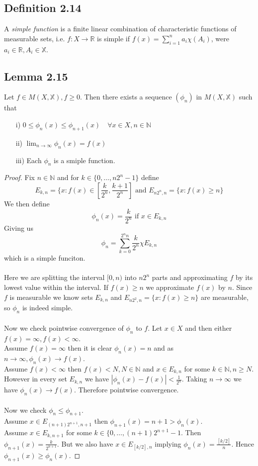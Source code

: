 \documentclass[a4paper, 12pt, twoside]{article}
\begin{document}
\subsection*{Definition 2.14}
A \emph{simple function} is a finite linear combination of characteristic functions of measurable sets, i.e. $f:X\to \mathbb{R}$ is simple if $f(x)=\sum_{i=1}^{n}a_{i} \chi(A_{i})$, were $a_{i}\in \mathbb{R}, A_{i}\in \mathbb{X}$.
\subsection*{Lemma 2.15}
Let $f\in M(X,\mathbb{X}),f\geq0$. Then there exists a sequence $(\phi_{n})$ in $M(X,\mathbb{X})$ such that
\begin{itemize}
    \item[i)] $0\leq \phi_{n}(x)\leq\phi_{n+1}(x)\quad\forall x\in X, n\in \mathbb{N}$
    \item[ii)] $\lim_{n\to\infty}\phi_{n}(x)=f(x)$
    \item[iii)] Each $\phi_{n}$ is a smiple function.
\end{itemize}
\begin{proof}
Fix $n\in \mathbb{N}$ and for $k\in \{0,\dots,n2^{n}-1\}$ define
$$E_{k,n}=\{x:f(x)\in[\frac{k}{2^{n}},\frac{k+1}{2^{n}}] \text{ and } E_{n2^{n},n}= \{x:f(x)\geq n\}$$
We then define
$$\phi_{n}(x)= \frac{k}{2^{n}} \text{ if } x\in E_{k,n}$$
Giving us
$$ \phi_{n}=\sum_{k=0}^{2^{n}n} \frac{k}{2^{n}}\chi E_{k,n}$$
which is a simple funciton. \\\\
Here we are splitting the interval $[0,n)$ into $n2^{n}$ parts and approximating $f$ by its lowest value within the interval. If $f(x)\geq n$ we approximate $f(x)$ by $n$. Since $f$ is measurable we know sets $E_{k,n}$ and $E_{n2^{2},n}=\{x:f(x)\geq n\}$ are measurable, so $\phi_{n}$ is indeed simple.\\\\
Now we check pointwise convergence of $\phi_{n}$ to $f$. Let $x\in X$ and then either $f(x)=\infty, f(x)<\infty$.\\
Assume $f(x)=\infty$ then it is clear $\phi_{n}(x)=n$ and as $n\to\infty, \phi_{n}(x)\to f(x)$.\\
Assume $f(x)<\infty$ then $f(x)<N,  N\in \mathbb{N}$ and $x\in E_{k,n}$ for some $k\in \mathbb{N},n\geq N$. However in every set $E_{k,n}$ we have $|\phi_{n}(x)-f(x)|<\frac{1}{2^{n}}$. Taking $n\to\infty$ we have $\phi_{n}(x)\to f(x)$. Therefore pointwise convergence.\\\\
Now we check $\phi_{n}\leq \phi_{n+1}$.\\
Assume $x\in E_{(n+1)2^{n+1},n+1}$ then $\phi_{n+1}(x)=n+1>\phi_{n}(x)$.\\
Assume $x\in E_{k,n+1}$ for some $k\in\{0,\dots,(n+1)2^{n+1}-1$. Then $\phi_{n+1}(x)=\frac{k}{2^{n+1}}$. But we also have $x\in E_{[k/2],n}$ implying $\phi_{n}(x)=\frac{[k/2]}{n}$. Hence $\phi_{n+1}(x)\geq\phi_{n}(x)$.
\end{proof}
\end{document}

